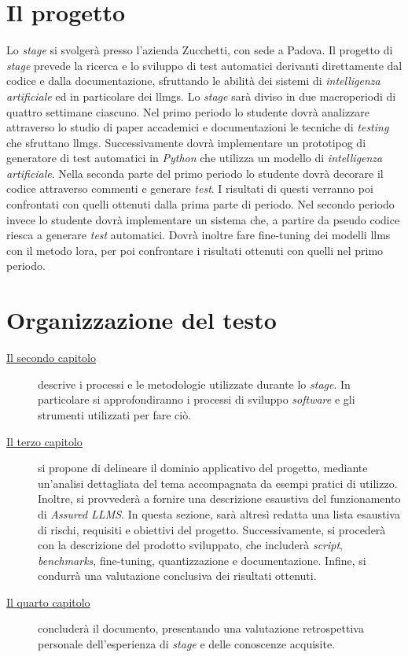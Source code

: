 \section{Il progetto}
Lo \textit{stage} si svolgerà presso l'azienda Zucchetti, con sede a Padova. Il progetto di \textit{stage} prevede la ricerca e lo sviluppo di test automatici derivanti direttamente dal codice e dalla documentazione, sfruttando le abilità dei sistemi di \textit{intelligenza artificiale} ed in particolare dei \glspl{llmg}.
Lo \textit{stage} sarà diviso in due macroperiodi di quattro settimane ciascuno. Nel primo periodo lo studente dovrà analizzare attraverso lo studio di paper accademici e documentazioni le tecniche di \textit{testing} che sfruttano \glspl{llmg}. Successivamente dovrà implementare un \gls{prototipog} di generatore di test automatici in \textit{Python} che utilizza un modello di \textit{intelligenza artificiale}. Nella seconda parte del primo periodo lo studente dovrà decorare il codice attraverso commenti e generare \textit{test}. I risultati di questi verranno poi confrontati con quelli ottenuti dalla prima parte di periodo. Nel secondo periodo invece lo studente dovrà implementare un sistema che, a partire da pseudo codice riesca a generare \textit{test} automatici. Dovrà inoltre fare \gls{fine-tuning} dei modelli \glspl{llm} con il metodo \gls{lora}, per poi confrontare i risultati ottenuti con quelli nel primo periodo.

\section{Organizzazione del testo}
\begin{description}
    \item[{\hyperref[chap:processi-metodologie]{Il secondo capitolo}}] descrive i processi e le metodologie utilizzate durante lo \textit{stage}. In particolare si approfondiranno i processi di sviluppo \textit{software} e gli strumenti utilizzati per fare ciò.
    
    \item[{\hyperref[chap:descrizione-stage]{Il terzo capitolo}}] si propone di delineare il dominio applicativo del progetto, mediante un'analisi dettagliata del tema accompagnata da esempi pratici di utilizzo. 
    Inoltre, si provvederà a fornire una descrizione esaustiva del funzionamento di \textit{Assured LLMS}. 
    In questa sezione, sarà altresì redatta una lista esaustiva di rischi, requisiti e obiettivi del progetto. 
    Successivamente, si procederà con la descrizione del prodotto sviluppato, che includerà \textit{script}, \textit{benchmarks}, \gls{fine-tuning}, quantizzazione e documentazione. 
    Infine, si condurrà una valutazione conclusiva dei risultati ottenuti.
    
    \item[{\hyperref[chap:conclusioni]{Il quarto capitolo}}] concluderà il documento, presentando una valutazione retrospettiva personale dell'esperienza di \textit{stage} e delle conoscenze acquisite.
    
\end{description}

